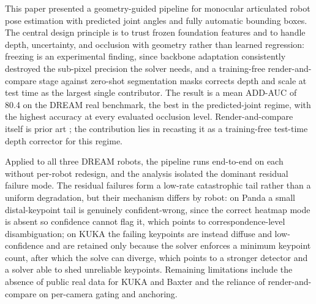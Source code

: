 This paper presented a geometry-guided pipeline for monocular articulated robot pose estimation with predicted joint angles and fully automatic bounding boxes. The central design principle is to trust frozen foundation features and to handle depth, uncertainty, and occlusion with geometry rather than learned regression: freezing is an experimental finding, since backbone adaptation consistently destroyed the sub-pixel precision the solver needs, and a training-free render-and-compare stage against zero-shot segmentation masks corrects depth and scale at test time as the largest single contributor. The result is a mean ADD-AUC of 80.4 on the DREAM real benchmark, the best in the predicted-joint regime, with the highest accuracy at every evaluated occlusion level. Render-and-compare itself is prior art \cite{labbe2021single,lu2023markerless}; the contribution lies in recasting it as a training-free test-time depth corrector for this regime.

Applied to all three DREAM robots, the pipeline runs end-to-end on each without per-robot redesign, and the analysis isolated the dominant residual failure mode. The residual failures form a low-rate catastrophic tail rather than a uniform degradation, but their mechanism differs by robot: on Panda a small distal-keypoint tail is genuinely confident-wrong, since the correct heatmap mode is absent so confidence cannot flag it, which points to correspondence-level disambiguation; on KUKA the failing keypoints are instead diffuse and low-confidence and are retained only because the solver enforces a minimum keypoint count, after which the solve can diverge, which points to a stronger detector and a solver able to shed unreliable keypoints. Remaining limitations include the absence of public real data for KUKA and Baxter and the reliance of render-and-compare on per-camera gating and anchoring.

